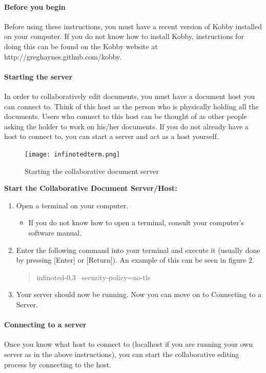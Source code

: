 \documentclass[11pt]{article}
\begin{document}
\paragraph{Before you begin} Before using these instructions, you must have a recent version of Kobby installed on your computer.  If you do not know how to install Kobby, instructions for doing this can be found on the Kobby website at http://greghaynes.github.com/kobby.

\paragraph{Starting the server} In order to collaboratively edit documents, you must have a document host you can connect to.  Think of this host as the person who is physically holding all the documents.  Users who connect to this host can be thought of as other people asking the holder to work on his/her documents.  If you do not already have a host to connect to, you can start a server and act as a host yourself.

\begin{figure}[tbh]
\begin{center}
 \texttt{[image: infinotedterm.png]}
\end{center}
\caption{Starting the collaborative document server}
\end{figure}

{\bf Start the Collaborative Document Server/Host:}\\
\begin{enumerate}
 \item Open a terminal on your computer.
 \begin{itemize}
  \item If you do not know how to open a terminal, consult your computer's software manual.
 \end{itemize}
 \item Enter the following command into your terminal and execute it (usually done by pressing [Enter] or [Return]).  An example of this can be seen in figure 2.
 \begin{quote}
  infinoted-0.3 --security-policy=no-tls
 \end{quote}
 \item Your server should now be running.  Now you can move on to Connecting to a Server.
\end{enumerate}

\paragraph{Connecting to a server} Once you know what host to connect to (localhost if you are running your own server as in the above instructions), you can start the collaborative editing process by connecting to the host. \\
\end{document}
